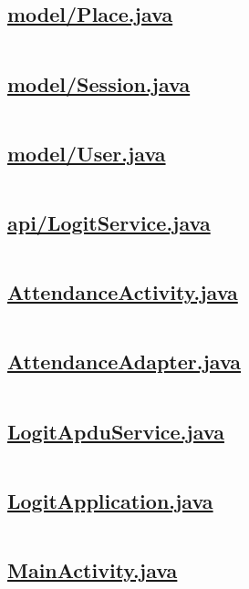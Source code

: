\subsection{\small \url{model/Place.java}}
\inputminted{java}{../logit/android/app/src/main/java/ba/unsa/etf/logit/model/Place.java}

\subsection{\small \url{model/Session.java}}
\inputminted{java}{../logit/android/app/src/main/java/ba/unsa/etf/logit/model/Session.java}

\subsection{\small \url{model/User.java}}
\inputminted{java}{../logit/android/app/src/main/java/ba/unsa/etf/logit/model/User.java}

\subsection{\small \url{api/LogitService.java}}
\inputminted{java}{../logit/android/app/src/main/java/ba/unsa/etf/logit/api/LogitService.java}

\subsection{\small \url{AttendanceActivity.java}}
\inputminted{java}{../logit/android/app/src/main/java/ba/unsa/etf/logit/AttendanceActivity.java}

\subsection{\small \url{AttendanceAdapter.java}}
\inputminted{java}{../logit/android/app/src/main/java/ba/unsa/etf/logit/AttendanceAdapter.java}

\subsection{\small \url{LogitApduService.java}}
\inputminted{java}{../logit/android/app/src/main/java/ba/unsa/etf/logit/LogitApduService.java}

\subsection{\small \url{LogitApplication.java}}
\inputminted{java}{../logit/android/app/src/main/java/ba/unsa/etf/logit/LogitApplication.java}

\subsection{\small \url{MainActivity.java}}
\inputminted{java}{../logit/android/app/src/main/java/ba/unsa/etf/logit/MainActivity.java}